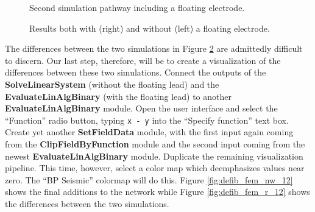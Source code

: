 \documentclass[fleqn,11pt,openany]{book}
\begin{document}
\begin{figure}
\caption{Second simulation pathway including a floating
electrode.}\label{fig:defib_fem_nw_11}
\end{figure}

\begin{figure}
\caption{Results both with (right) and without (left) a floating
electrode.}\label{fig:defib_fem_r_11}
\end{figure}

The differences between the two simulations in Figure
\ref{fig:defib_fem_r_11} are admittedly difficult to discern. Our last
step, therefore, will be to create a visualization of the differences
between these two simulations. Connect the outputs of the {\bf
SolveLinearSystem} (without the floating lead) and the {\bf
EvaluateLinAlgBinary} (with the floating lead) to another {\bf
EvaluateLinAlgBinary} module. Open the user interface and select the
``Function'' radio button, typing {\tt x - y} into the ``Specify
function'' text box. Create yet another {\bf SetFieldData} module,
with the first input again coming from the {\bf ClipFieldByFunction}
module and the second input coming from the newest {\bf
EvaluateLinAlgBinary} module. Duplicate the remaining visualization
pipeline. This time, however, select a color map which deemphasizes
values near zero. The ``BP Seismic'' colormap will do this. Figure
\ref{fig:defib_fem_nw_12} shows the final additions to the network
while Figure \ref{fig:defib_fem_r_12} shows the differences between
the two simulations.
\end{document}

